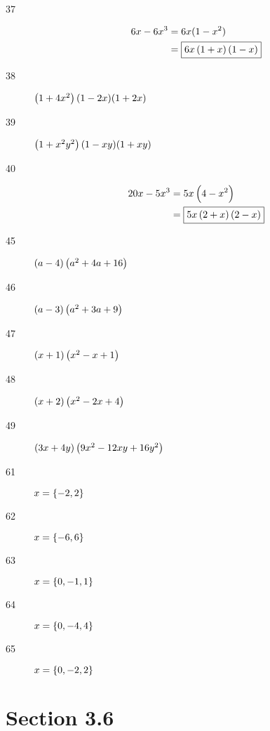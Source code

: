 \documentclass[letterpaper, landscape]{exam}
\begin{document}
\begin{description}
      \item[37] 
        \begin{align*}
          6x - 6x^3 & = 6x(1 - x^2) \\
                    & = \boxed{ 6x \del{1 + x} \del{1 - x} } \\
        \end{align*}

      \item[38] $\del{1 + 4x^2} (1 - 2x)(1 + 2x)$

      \item[39] $\del{1 + x^2y^2} (1 - xy)(1 + xy)$

      \item[40] 
        \begin{align*}
          20x - 5x^3 & = 5x \del{ 4 - x^2 } \\
                     & = \boxed{ 5x \del{2 + x} \del{2 - x} } \\
        \end{align*}

      \item[45] $\del{a - 4} \del{a^2 + 4a + 16}$

      \item[46] $\del{a - 3} \del{a^2 + 3a + 9}$

      \item[47] $\del{x + 1} \del{x^2 - x + 1}$

      \item[48] $\del{x + 2} \del{x^2 - 2x + 4}$

      \item[49] $\del{3x + 4y} \del{9x^2 - 12xy + 16y^2}$

      \item[61] $x = \cbr{ -2, 2 }$
        
      \item[62] $x = \cbr{ -6, 6 }$

      \item[63] $x = \cbr{ 0, -1, 1 }$

      \item[64] $x = \cbr{ 0, -4, 4 }$

      \item[65] $x = \cbr{ 0, -2, 2 }$

    \end{description}

    \section{Section 3.6} %
    
\end{document}
